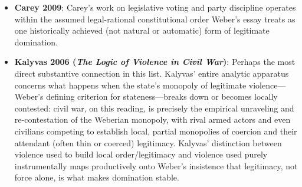 \documentclass[12pt]{article}
\begin{document}
\begin{itemize}[leftmargin=*, itemsep=4pt]
    \item \textbf{Carey 2009}: Carey's work on legislative voting and party discipline operates within the assumed legal-rational constitutional order Weber's essay treats as one historically achieved (not natural or automatic) form of legitimate domination.
    \item \textbf{Kalyvas 2006 (\textit{The Logic of Violence in Civil War})}: Perhaps the most direct substantive connection in this list. Kalyvas' entire analytic apparatus concerns what happens when the state's monopoly of legitimate violence---Weber's defining criterion for stateness---breaks down or becomes locally contested: civil war, on this reading, is precisely the empirical unraveling and re-contestation of the Weberian monopoly, with rival armed actors and even civilians competing to establish local, partial monopolies of coercion and their attendant (often thin or coerced) legitimacy. Kalyvas' distinction between violence used to build local order/legitimacy and violence used purely instrumentally maps productively onto Weber's insistence that legitimacy, not force alone, is what makes domination stable.
\end{itemize}
\end{document}
